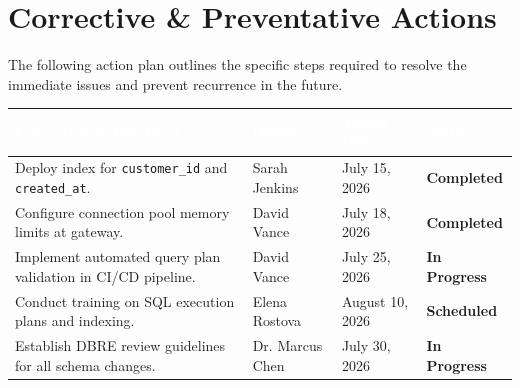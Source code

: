 \section{Corrective \& Preventative Actions}
The following action plan outlines the specific steps required to resolve the immediate issues and prevent recurrence in the future.

\begin{tabularx}{\textwidth}{X >{\raggedright\arraybackslash\small}p{2.8cm} >{\raggedright\arraybackslash\small}p{2.2cm} >{\centering\arraybackslash\small}p{2.5cm}}
  \hline
  \rowcolor{PrimaryColor}
  \textcolor{white}{\textbf{Corrective Action Item}} & \textcolor{white}{\textbf{Owner}} & \textcolor{white}{\textbf{Target Date}} & \textcolor{white}{\textbf{Status}} \\
  \hline
  Deploy index for \texttt{customer\_id} and \texttt{created\_at}. & Sarah Jenkins & July 15, 2026 & \textcolor{SuccessColor}{\textbf{Completed}} \\
  \rowcolor{LightNeutral}
  Configure connection pool memory limits at gateway. & David Vance & July 18, 2026 & \textcolor{SuccessColor}{\textbf{Completed}} \\
  Implement automated query plan validation in CI/CD pipeline. & David Vance & July 25, 2026 & \textcolor{AccentColor}{\textbf{In Progress}} \\
  \rowcolor{LightNeutral}
  Conduct training on SQL execution plans and indexing. & Elena Rostova & August 10, 2026 & \textbf{Scheduled} \\
  Establish DBRE review guidelines for all schema changes. & Dr. Marcus Chen & July 30, 2026 & \textcolor{AccentColor}{\textbf{In Progress}} \\
  \hline
\end{tabularx}

\vspace{0.5cm}

